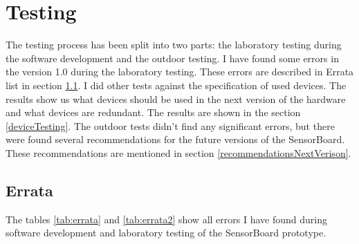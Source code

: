 \section{Testing}
\label{HWtesting}
The testing process has been split into two parts: the laboratory testing during the software development and the outdoor testing. I have found some errors in the version 1.0 during the laboratory testing. These errors are described in Errata list in section \ref{errata}. I did other tests against the specification of used devices. The results show us what devices should be used in the next version of the hardware and what devices are redundant. The results are shown in the section \ref{deviceTesting}. The outdoor tests didn't find any significant errors, but there were found several recommendations for the future versions of the SensorBoard. These recommendations are mentioned in section \ref{recommendationsNextVerison}.

\subsection{Errata}
\label{errata}
The tables \ref{tab:errata} and \ref{tab:errata2} show all errors I have found during software development and laboratory testing of the SensorBoard prototype.

